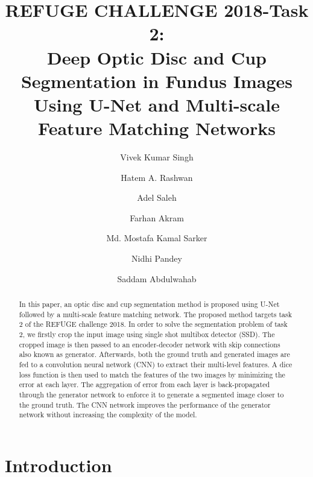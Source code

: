 \documentclass[runningheads,a4paper]{llncs}
\begin{document}
\mainmatter  %

\title{REFUGE CHALLENGE 2018-Task 2:\\ Deep Optic Disc and Cup Segmentation in Fundus Images Using U-Net and Multi-scale Feature Matching Networks}



\author{Vivek Kumar Singh \and Hatem A. Rashwan  \and Adel Saleh \and Farhan Akram  \and Md. Mostafa Kamal Sarker \and Nidhi Pandey \and Saddam Abdulwahab  }







\maketitle
\begin{abstract}
In this paper, an optic disc and cup segmentation method is proposed using U-Net followed by a multi-scale feature matching network. The proposed method targets task 2 of the REFUGE challenge 2018. In order to solve the segmentation problem of task 2, we firstly crop the input image using single shot multibox detector (SSD). The cropped image is then passed to an encoder-decoder network with skip connections also known as generator. Afterwards, both the ground truth and generated images are fed to a convolution neural network (CNN) to extract their multi-level features. A dice loss function is then used to match the features of the two images by minimizing the error at each layer. The aggregation of error from each layer is back-propagated through the generator network to enforce it to generate a segmented image closer to the ground truth. The CNN network improves the performance of the generator network without increasing the complexity of the model.
\end{abstract}

\section{Introduction}
\end{document}
